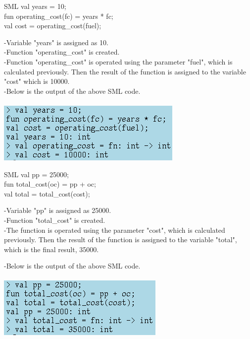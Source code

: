 \documentclass{article}
\begin{document}
\begin{GFT}{SML}
\+val years = 10; \\
\+fun operating\_cost(fc) = years * fc;\\
\+val cost = operating\_cost(fuel);\\
\end{GFT}
-Variable "years" is assigned as 10. \\
-Function "operating_cost" is created. \\
-Function "operating_cost" is operated using the parameter "fuel", which is calculated previously. Then the result of the function is assigned to the variable "cost" which is 10000. \\
-Below is the output of the above SML code. \\
\smallskip \\
\includegraphics[scale =0.6]{costsml.png} \\
\noindent{\color{red}\rule{\linewidth}{0.5mm}}
\begin{GFT}{SML}
\+val pp = 25000; \\
\+fun total\_cost(oc) = pp + oc;\\
\+val total = total\_cost(cost);\\
\end{GFT}
-Variable "pp" is assigned as 25000. \\
-Function "total_cost" is created. \\
-The function is operated using the parameter "cost", which is calculated previously. Then the result of the function is assigned to the variable "total", which is the final result, 35000. \\
\clearpage

-Below is the output of the above SML code. \\
\smallskip \\
\includegraphics[scale =0.6]{totalsml.png} \\
\noindent{\color{red}\rule{\linewidth}{0.5mm}} 
\end{document}
